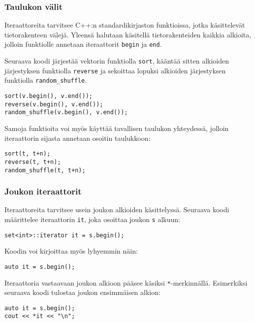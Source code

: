 \subsubsection{Taulukon välit}

Iteraattoreita tarvitsee
C++:n standardikirjaston funktioissa, jotka käsittelevät
tietorakenteen välejä.
Yleensä halutaan käsitellä tietorakenteiden kaikkia
alkioita, jolloin funktiolle annetaan
iteraattorit \texttt{begin} ja \texttt{end}.

Seuraava koodi järjestää vektorin funktiolla \texttt{sort},
kääntää sitten alkioiden järjestyksen funktiolla \texttt{reverse}
ja sekoittaa lopuksi alkioiden järjestyksen funktiolla \texttt{random\_shuffle}.


\begin{lstlisting}
sort(v.begin(), v.end());
reverse(v.begin(), v.end());
random_shuffle(v.begin(), v.end());
\end{lstlisting}

Samoja funktioita voi myös käyttää tavallisen taulukon
yhteydessä, jolloin iteraattorin sijasta annetaan
osoitin taulukkoon:

\begin{lstlisting}
sort(t, t+n);
reverse(t, t+n);
random_shuffle(t, t+n);
\end{lstlisting}

\subsubsection{Joukon iteraattorit}

Iteraattoreita tarvitsee usein joukon
alkioiden käsittelyssä.
Seuraava koodi määrittelee iteraattorin
\texttt{it}, joka osoittaa joukon \texttt{s} alkuun:
\begin{lstlisting}
set<int>::iterator it = s.begin();
\end{lstlisting}
Koodin voi kirjoittaa myös lyhyemmin näin:
\begin{lstlisting}
auto it = s.begin();
\end{lstlisting}
Iteraattoria vastaavaan joukon alkioon
pääsee käsiksi \texttt{*}-merkinnällä.
Esimerkiksi seuraava koodi tulostaa
joukon ensimmäisen alkion:

\begin{lstlisting}
auto it = s.begin();
cout << *it << "\n";
\end{lstlisting}


